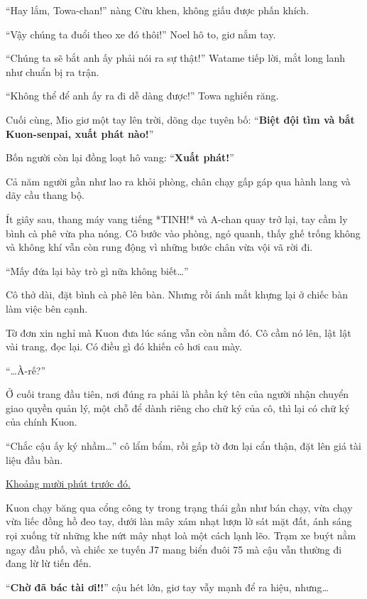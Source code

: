 \documentclass[../main.tex]{subfiles}
\begin{document}
``Hay lắm, Towa-chan!'' nàng Cừu khen, không giấu được phấn khích.

``Vậy chúng ta đuổi theo xe đó thôi!'' Noel hô to, giơ nắm tay.

``Chúng ta sẽ bắt anh ấy phải nói ra sự thật!'' Watame tiếp lời, mắt long lanh như chuẩn bị ra trận.

``Không thể để anh ấy ra đi dễ dàng được!'' Towa nghiến răng.

Cuối cùng, Mio giơ một tay lên trời, dõng dạc tuyên bố: ``\textbf{Biệt đội tìm và bắt Kuon-senpai, xuất phát nào!}''

Bốn người còn lại đồng loạt hô vang: ``\textbf{Xuất phát!}''

Cả năm người gần như lao ra khỏi phòng, chân chạy gấp gáp qua hành lang và dãy cầu thang bộ.

Ít giây sau, thang máy vang tiếng *TINH!* và A-chan quay trở lại, tay cầm ly bình cà phê vừa pha nóng. Cô bước vào phòng, ngó quanh, thấy ghế trống không và không khí vẫn còn rung động vì những bước chân vừa vội vã rời đi.

``Mấy đứa lại bày trò gì nữa không biết\dots''

Cô thở dài, đặt bình cà phê lên bàn. Nhưng rồi ánh mắt khựng lại ở chiếc bàn làm việc bên cạnh.

Tờ đơn xin nghỉ mà Kuon đưa lúc sáng vẫn còn nằm đó. Cô cầm nó lên, lật lật vài trang, đọc lại. Có điều gì đó khiến cô hơi cau mày.

``\dots À-rế?''

Ở cuối trang đầu tiên, nơi đúng ra phải là phần ký tên của người nhận chuyển giao quyền quản lý, một chỗ để dành riêng cho chữ ký của cô, thì lại có chữ ký của chính Kuon.

``Chắc cậu ấy ký nhầm\dots'' cô lẩm bẩm, rồi gấp tờ đơn lại cẩn thận, đặt lên giá tài liệu đầu bàn.

\begin{center}
    \uline{Khoảng mười phút trước đó.}
\end{center}

Kuon chạy băng qua cổng công ty trong trạng thái gần như bán chạy, vừa chạy vừa liếc đồng hồ đeo tay, dưới làn mây xám nhạt lượn lờ sát mặt đất, ánh sáng rọi xuống từ những khe nứt mây nhạt loà một cách lạnh lẽo. Trạm xe buýt nằm ngay đầu phố, và chiếc xe tuyến J7 mang biển đuôi 75 mà cậu vẫn thường đi đang lừ lừ tiến đến.

``\textbf{Chờ đã bác tài ơi!!}'' cậu hét lớn, giơ tay vẫy mạnh để ra hiệu, nhưng\dots
\end{document}
